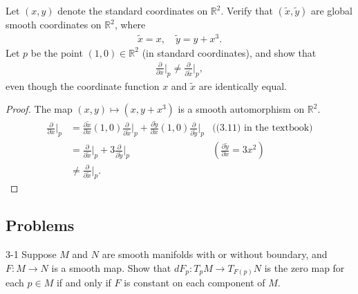 \begin{customexer}{3.17}
  Let $(x, y)$ denote the standard coordinates on $\mathbb{R}^2$.
  Verify that $(\tilde{x}, \tilde{y})$ are global smooth coordinates on $\mathbb{R}^2$, where
  \begin{align*}
    \tilde{x} = x, \quad \tilde{y} = y + x^3.
  \end{align*}
  Let $p$ be the point $(1, 0) \in \mathbb{R}^2$ (in standard coordinates), and show that
  \begin{align*}
    \frac{\partial}{\partial x}\Big\vert_p \ne \frac{\partial}{\partial \tilde{x}}\Big\vert_p,
  \end{align*}
  even though the coordinate function $x$ and $\tilde{x}$ are identically equal.
\end{customexer}

\begin{proof}
  The map $(x, y) \mapsto (x, y + x^3)$ is a smooth automorphism on $\mathbb{R}^2$.
  \begin{align*}
    \frac{\partial}{\partial x}\Big\vert_p
      &= \frac{\partial \tilde{x}}{\partial x}(1, 0)\frac{\partial}{\partial \tilde{x}}\Big\vert_p + \frac{\partial \tilde{y}}{\partial x}(1, 0)\frac{\partial}{\partial \tilde{y}}\Big\vert_p & \text{((3.11) in the textbook)} \\
      &= \frac{\partial}{\partial \tilde{x}}\Big\vert_p + 3\frac{\partial}{\partial \tilde{y}}\Big\vert_p & (\frac{\partial \tilde{y}}{\partial x} = 3x^2) \\
      &\ne \frac{\partial}{\partial \tilde{x}}\Big\vert_p.
  \end{align*}
\end{proof}

\subsection{Problems}

\begin{customprob}{3-1}
  Suppose $M$ and $N$ are smooth manifolds with or without boundary, and $F: M \rightarrow N$ is a smooth map.
  Show that $dF_p: T_pM \rightarrow T_{F(p)}N$ is the zero map for each $p \in M$ if and only if $F$ is constant on each component of $M$.
\end{customprob}

